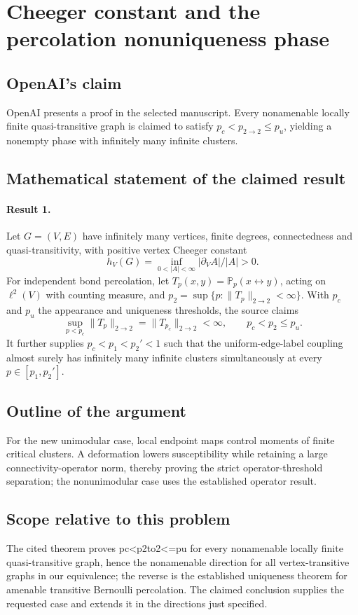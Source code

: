 \documentclass[11pt]{article}
\begin{document}
\section*{Cheeger constant and the percolation nonuniqueness phase}

\subsection{OpenAI's claim}
OpenAI presents a proof in the selected manuscript. Every nonamenable locally finite quasi-transitive graph is claimed to satisfy $p_c<p_{2\to2}\leq p_u$, yielding a nonempty phase with infinitely many infinite clusters.

\subsection{Mathematical statement of the claimed result}
\paragraph{Result 1.} Let \(G=(V,E)\) have infinitely many vertices, finite degrees, connectedness and quasi-transitivity, with positive vertex Cheeger constant
\[
 h_V(G)=\inf_{0<|A|<\infty}|\partial_VA|/|A|>0.
\]
For independent bond percolation, let \(T_p(x,y)=\mathbb P_p(x\leftrightarrow y)\), acting on \(\ell^2(V)\) with counting measure, and \(p_2=\sup\{p:\|T_p\|_{2\to2}<\infty\}\). With \(p_c\) and \(p_u\) the appearance and uniqueness thresholds, the source claims
\[
 \sup_{p<p_c}\|T_p\|_{2\to2}=\|T_{p_c}\|_{2\to2}<\infty,
 \qquad p_c<p_2\le p_u.
\]
It further supplies \(p_c<p_1<p_2'<1\) such that the uniform-edge-label coupling almost surely has infinitely many infinite clusters simultaneously at every \(p\in[p_1,p_2']\).

\subsection{Outline of the argument}
For the new unimodular case, local endpoint maps control moments of finite critical clusters. A deformation lowers susceptibility while retaining a large connectivity-operator norm, thereby proving the strict operator-threshold separation; the nonunimodular case uses the established operator result.

\subsection{Scope relative to this problem}
The cited theorem proves pc<p2to2<=pu for every nonamenable locally finite quasi-transitive graph, hence the nonamenable direction for all vertex-transitive graphs in our equivalence; the reverse is the established uniqueness theorem for amenable transitive Bernoulli percolation. The claimed conclusion supplies the requested case and extends it in the directions just specified.
\end{document}
